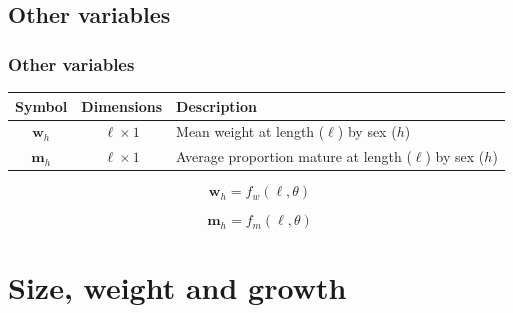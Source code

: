 \documentclass{beamer}
\begin{document}

\subsection{Other variables}
\begin{frame}
\frametitle{Other variables}

\begin{table}
  \centering
  \begin{tabular}{ccl}
  \hline
  Symbol  & Dimensions & Description \\
  \hline
      $\boldsymbol{w}_{h}$ & $\ell \times 1$ & Mean weight at length ($\ell$) by sex ($h$) \\
      $\boldsymbol{m}_{h} $ & $\ell \times 1$ & Average proportion mature at length ($\ell$) by sex ($h$) \\
  \hline
  \end{tabular}
\end{table}

\begin{equation*}
  \boldsymbol{w}_{h} = f_w(\ell,\theta)
\end{equation*}

\begin{equation*}
  \boldsymbol{m}_{h} = f_m(\ell,\theta)
\end{equation*}


\end{frame}


\section{Size, weight and growth}

\end{document}
